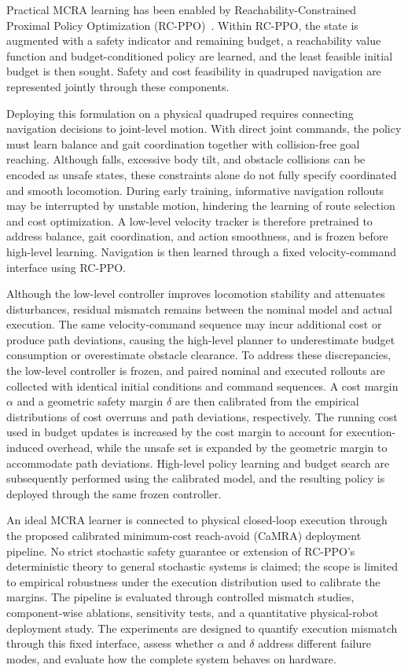 \documentclass[conference]{IEEEtran}
\begin{document}
Practical MCRA learning has been enabled by Reachability-Constrained Proximal
Policy Optimization (RC-PPO)~\cite{so2024}.
Within RC-PPO, the state is augmented with a safety indicator and remaining budget,
a reachability value function and budget-conditioned policy are learned, and
the least feasible initial budget is then sought. Safety and cost feasibility in
quadruped navigation are represented jointly through these components.

Deploying this formulation on a physical quadruped requires connecting navigation
decisions to joint-level motion. With direct joint commands, the policy must learn
balance and gait coordination together with collision-free goal reaching. Although
falls, excessive body tilt, and obstacle collisions can be encoded as unsafe
states, these constraints alone do not fully specify coordinated and smooth
locomotion. During early training, informative navigation rollouts may be interrupted by
unstable motion, hindering the learning of route selection and cost optimization. A low-level velocity tracker is therefore pretrained
to address balance, gait coordination, and action smoothness, and is frozen before
high-level learning. Navigation is then learned through a fixed velocity-command
interface using RC-PPO.

Although the low-level controller improves locomotion stability and attenuates
disturbances, residual mismatch remains between the nominal model and actual
execution. The same velocity-command sequence may incur additional cost or produce
path deviations, causing the high-level planner to underestimate budget
consumption or overestimate obstacle clearance. To address these discrepancies,
the low-level controller is frozen, and paired nominal and executed
rollouts are collected with identical initial conditions and command sequences. A
cost margin $\alpha$ and a geometric safety margin $\delta$ are then calibrated from the
empirical distributions of cost overruns and path deviations, respectively. The
running cost used in budget updates is increased by the cost margin to account for
execution-induced overhead, while the unsafe set is expanded by the geometric margin to
accommodate path deviations. High-level policy learning and budget search are
subsequently performed using the calibrated model, and the resulting policy is
deployed through the same frozen controller.

An ideal MCRA learner is connected to physical closed-loop execution through the proposed
calibrated minimum-cost reach-avoid (CaMRA) deployment pipeline. No strict
stochastic safety guarantee or extension of RC-PPO's deterministic theory to general
stochastic systems is claimed; the scope is limited to empirical robustness under
the execution distribution used to calibrate the margins. The pipeline is evaluated
through controlled mismatch studies, component-wise ablations, sensitivity tests,
and a quantitative physical-robot deployment study. The experiments are designed to
quantify execution mismatch through this fixed interface, assess whether
$\alpha$ and $\delta$ address different failure modes, and evaluate how the
complete system behaves on hardware.
\end{document}

